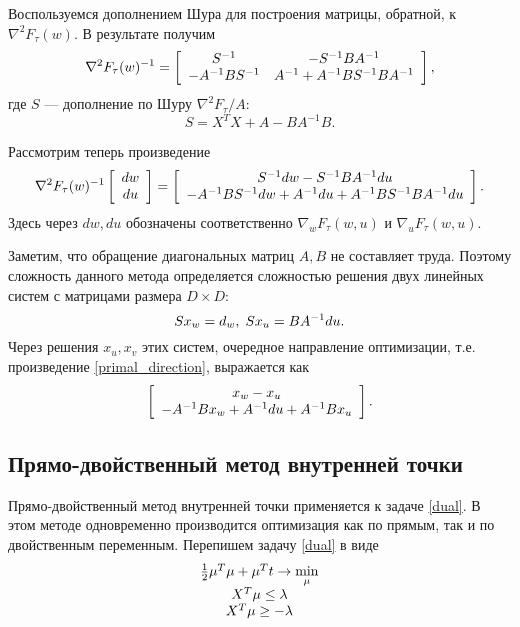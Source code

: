 \documentclass[12pt]{article}
\begin{document}
			Воспользуемся дополнением Шура для построения матрицы, обратной, к $\nabla^2 F_\tau(w)$. В результате получим 
			$$
			\nabla^2 F_\tau(w)^{-1} = 
			\left[
			\begin{array}[l]{cc}
				S^{-1} & -S^{-1} B A^{-1}\\
				- A^{-1} B S^{-1} & A^{-1} + A^{-1} B S^{-1} B A^{-1} 
			\end{array}
			\right],
			$$
			где $S$ — дополнение по Шуру $\nabla^2 F_\tau / A$:
			$$S = X^T X + A - B A^{-1} B.$$
			
			Рассмотрим теперь произведение 
			\begin{equation}\label{primal_direction}
			\nabla^2 F_\tau(w)^{-1}  
			\left [
			\begin{array}[l]{c}
				dw\\
				du
			\end{array}
			\right ] = 
			\left [
			\begin{array}[l]{c}
				S^{-1} dw - S^{-1} B A^{-1} du\\
				-A^{-1} B S^{-1} dw + A^{-1} du  + A^{-1} BS^{-1} B A^{-1} du
			\end{array}
			\right ].
			\end{equation}
			Здесь через $dw, du$ обозначены соответственно $\nabla_w F_\tau(w, u)$ и $\nabla_u F_\tau(w, u)$.
			
			Заметим, что обращение диагональных матриц $A, B$ не составляет труда. Поэтому сложность данного метода определяется сложностью решения двух линейных систем с матрицами размера $D \times D$: 
			$$S x_w = d_w, \hspace{0.1cm} S x_u = B A^{-1} du.$$
			Через решения $x_u, x_v$ этих систем, очередное направление оптимизации, т.е. произведение \ref{primal_direction}, выражается как
			$$ 
			\left [
			\begin{array}[l]{c}
				x_w - x_u\\
				-A^{-1} B x_w + A^{-1} du  + A^{-1} Bx_u
			\end{array}
			\right ].
			$$
	
	\subsection{Прямо-двойственный метод внутренней точки}
	
		Прямо-двойственный метод внутренней точки применяется к задаче \ref{dual}. В этом методе одновременно производится оптимизация как по прямым, так и по двойственным переменным. 
		Перепишем задачу \ref{dual} в виде 
		\begin{equation} \label{dual_smooth}
			\begin{array}[l]{c}
				\frac 1 2 \mu^T \mu + \mu^T t \rightarrow \min\limits_{\mu}\\
				X^T \mu \le \lambda \\
				X^T \mu \ge - \lambda\\
			\end{array}
		\end{equation}
		
\end{document}
